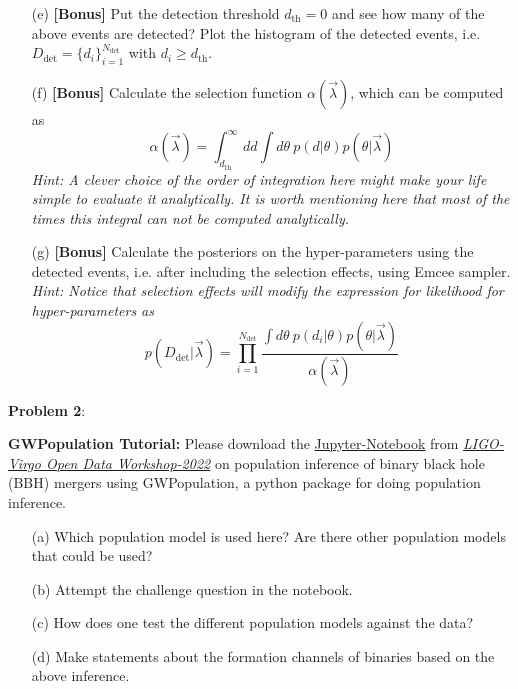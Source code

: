 \documentclass{article} %
\newcommand{\question}[2][]{\begin{flushleft}
        \textbf{Problem #1}: %
\end{flushleft}
}
\begin{document}
\begin{enumerate}
    \item[(e)] \textbf{[Bonus]} Put the detection threshold $d_\mathrm{th} = 0$ and see how many of the above events are detected? Plot the histogram of the detected events, i.e. $D_{\mathrm{det}} = \{ d_i\}_{i=1}^{N_{\mathrm{det}}}$ with $d_i \geq d_{\mathrm{th}}$.
    
    \item[(f)] \textbf{[Bonus]} Calculate the selection function $\alpha(\Vec{\lambda})$, which can be computed as
    \begin{equation}
        \alpha(\Vec{\lambda}) = \int_{d_{\mathrm{th}}}^\infty d d \int d\theta \ p(d|\theta) p(\theta|\Vec{\lambda})
    \end{equation}
    \textit{Hint: A clever choice of the order of integration here might make your life simple to evaluate it analytically. It is worth mentioning here that most of the times this integral can not be computed analytically.}
    
    \item[(g)] \textbf{[Bonus]} Calculate the posteriors on the hyper-parameters using the detected events, i.e. after including the selection effects, using Emcee sampler. \textit{Hint: Notice that selection effects will modify the expression for likelihood for hyper-parameters as}
    \begin{equation}
        p(D_{\mathrm{det}}|\Vec{\lambda}) =  \prod_{i=1}^{N_{\mathrm{det}}} \frac{\int d \theta \ p(d_i|\theta) p(\theta|\Vec{\lambda})}{\alpha(\Vec{\lambda})}
    \end{equation}

    \end{enumerate}

    \question[2]{} \textbf{GWPopulation Tutorial:} Please download the \href{https://github.com/gw-odw/odw-2022/blob/main/Tutorials/Advanced_topics/Tuto_A.2_Population_Inference_with_GWPopulation.ipynb}{Jupyter-Notebook} from \href{https://www.gw-openscience.org/odw/odw2022/}{\textit{LIGO-Virgo Open Data Workshop-2022}} on population inference of binary black hole (BBH) mergers using GWPopulation, a python package for doing population inference.
    \begin{enumerate}
        \item[(a)] Which population model is used here? Are there other population models that could be used?
        \item[(b)] Attempt the challenge question in the notebook.
	    \item[(c)] How does one test the different population models against the data? 
	    \item[(d)] Make statements about the formation channels of binaries based on the above inference.
    \end{enumerate}
    
\end{document}
